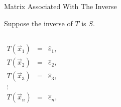 \documentclass[svgnames,table,,aspectratio=169]{beamer}
\begin{document}
  \begin{frame}{Matrix Associated With The Inverse}

    Suppose the inverse of $T$ is $S$.
    \begin{columns}

      \begin{eqnarray*}
        T\left(\vec{x}_1\right) & = & \hat{e}_1, \\
        T\left(\vec{x}_2\right) & = & \hat{e}_2, \\
        T\left(\vec{x}_3\right) & = & \hat{e}_3, \\
        \vdots & & \\
        T\left(\vec{x}_n\right) & = & \hat{e}_n, \\
      \end{eqnarray*}



      
    \end{columns}
  \end{frame}
\end{document}
